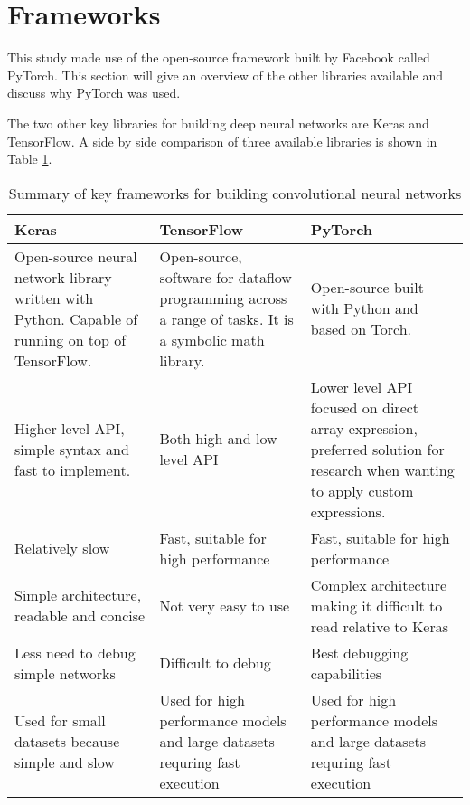\section{Frameworks}
This study made use of the open-source framework built by Facebook called PyTorch. This section will give an overview of the other libraries available and discuss why PyTorch was used.
\par
The two other key libraries for building deep neural networks are Keras and TensorFlow. A side by side comparison of three available libraries is shown in Table \ref{tab.framework}.
\begin{table}
    \centering
    \caption{Summary of key frameworks for building convolutional neural networks}
\begin{tabular}{ p{1.6in} p{2in} p{1.5in} }\toprule
\textbf{Keras} & \textbf{TensorFlow} & \textbf{PyTorch} \\ \toprule
Open-source neural network library written with Python. Capable of running on top of TensorFlow. & Open-source, software for dataflow programming across a range of tasks. It is a symbolic math library. & Open-source built with Python and based on Torch. \\
Higher level API, simple syntax and fast to implement. & Both high and low level API & Lower level API focused on direct array expression, preferred solution for research when wanting to apply custom expressions. \\
Relatively slow & Fast, suitable for high performance  &  Fast, suitable for high performance \\
Simple architecture, readable and concise &  Not very easy to use & Complex architecture making it difficult to read relative to Keras \\
Less need to debug simple networks  &  Difficult to debug & Best debugging capabilities \\
Used for small datasets because simple and slow   & Used for high performance models and large datasets requring fast execution & Used for high performance models and large datasets requring fast execution \\ \bottomrule
\end{tabular}
\label{tab.framework}
\end{table}

